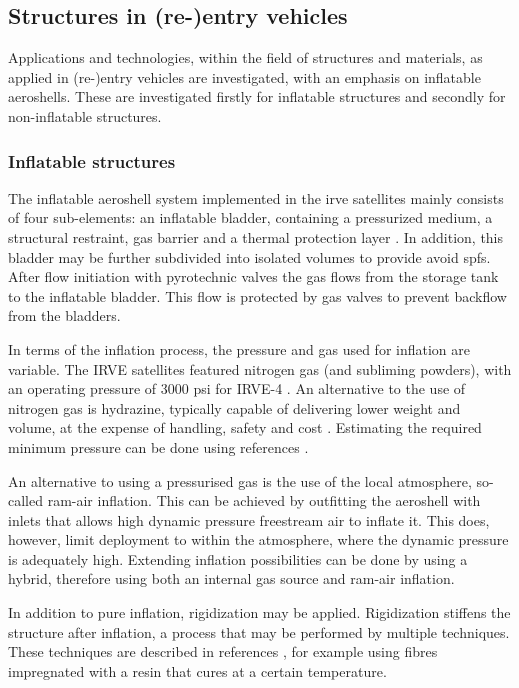 \subsection{Structures in (re-)entry vehicles}\label{sec:struc}
Applications and technologies, within the field of structures and materials, as applied in (re-)entry vehicles are investigated, with an emphasis on inflatable aeroshells. These are investigated firstly for inflatable structures and secondly for non-inflatable structures.

\subsubsection{Inflatable structures}
The inflatable aeroshell system implemented in the \gls{irve} satellites mainly consists of four sub-elements: an inflatable bladder, containing a pressurized medium, a structural restraint, gas barrier and a thermal protection layer \cite{Hughes2005}. In addition, this bladder may be further subdivided into isolated volumes to provide avoid \gls{spfs}. After flow initiation with pyrotechnic valves the gas flows from the storage tank to the inflatable bladder. This flow is protected by gas valves to prevent backflow from the bladders. \cite{Hughes2005} 

In terms of the inflation process, the pressure and gas used for inflation are variable. The IRVE satellites featured nitrogen gas (and subliming powders), with an operating pressure of 3000 psi for IRVE-4 \cite{Litton2011}. An alternative to the use of nitrogen gas is hydrazine, typically capable of delivering lower weight and volume, at the expense of handling, safety and cost \cite{Freeland1998}. Estimating the required minimum pressure can be done using references \cite{Samareh2011, Brown2009}.

An alternative to using a pressurised gas is the use of the local atmosphere, so-called ram-air inflation. This can be achieved by outfitting the aeroshell with inlets that allows high dynamic pressure freestream air to inflate it. This does, however, limit deployment to within the atmosphere, where the dynamic pressure is adequately high. Extending inflation possibilities can be done by using a hybrid, therefore using both an internal gas source and ram-air inflation\cite{Smith2010}.

In addition to pure inflation, rigidization may be applied. Rigidization stiffens the structure after inflation, a process that may be performed by multiple techniques. These techniques are described in references \cite{Freeland1998,Jenkins2001}, for example using fibres impregnated with a resin that cures at a certain temperature. 


